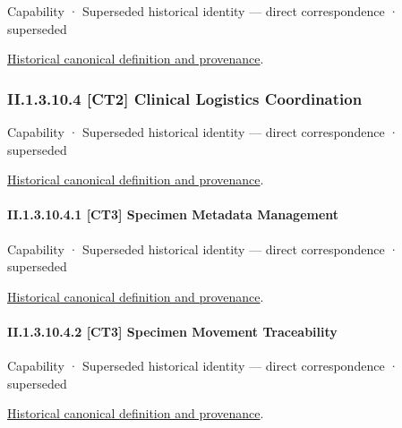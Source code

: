 \label{element:8a4b918e1c9d47bb99daf2b42008ab39}
{\small Capability · Superseded historical identity — direct correspondence · superseded}\par
\href{../../../../continuum/strategy/capability/8a4b918e1c9d47bb99daf2b42008ab39.md}{Historical canonical definition and provenance}.\par
\subsubsection*{II.1.3.10.4 [CT2] Clinical Logistics Coordination}
\label{navigation:II.1.3.10.4}

\label{element:90a782ff2d004fa984ae0465528b2253}
{\small Capability · Superseded historical identity — direct correspondence · superseded}\par
\href{../../../../continuum/strategy/capability/90a782ff2d004fa984ae0465528b2253.md}{Historical canonical definition and provenance}.\par
\paragraph*{II.1.3.10.4.1 [CT3] Specimen Metadata Management}
\label{navigation:II.1.3.10.4.1}

\label{element:3b000d3712534d16a48470f79df8e33a}
{\small Capability · Superseded historical identity — direct correspondence · superseded}\par
\href{../../../../continuum/strategy/capability/3b000d3712534d16a48470f79df8e33a.md}{Historical canonical definition and provenance}.\par
\paragraph*{II.1.3.10.4.2 [CT3] Specimen Movement Traceability}
\label{navigation:II.1.3.10.4.2}

\label{element:129119d7b2744ffd805c58f25557fa27}
{\small Capability · Superseded historical identity — direct correspondence · superseded}\par
\href{../../../../continuum/strategy/capability/129119d7b2744ffd805c58f25557fa27.md}{Historical canonical definition and provenance}.\par
